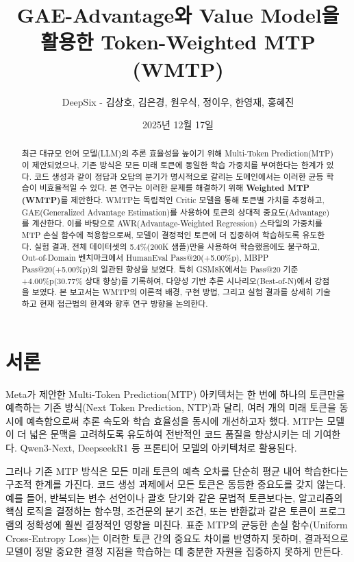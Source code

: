 \documentclass[11pt,a4paper]{article}
\title{\textbf{GAE-Advantage와 Value Model을 활용한 Token-Weighted MTP (WMTP)}}
\author{DeepSix - 김상호, 김은경, 원우식, 정이우, 한영재, 홍혜진}
\date{2025년 12월 17일}
\begin{document}
\maketitle

\begin{abstract}
최근 대규모 언어 모델(LLM)의 추론 효율성을 높이기 위해 Multi-Token Prediction(MTP)이 제안되었으나, 기존 방식은 모든 미래 토큰에 동일한 학습 가중치를 부여한다는 한계가 있다. 코드 생성과 같이 정답과 오답의 분기가 명시적으로 갈리는 도메인에서는 이러한 균등 학습이 비효율적일 수 있다. 본 연구는 이러한 문제를 해결하기 위해 \textbf{Weighted MTP (WMTP)}를 제안한다. WMTP는 독립적인 Critic 모델을 통해 토큰별 가치를 추정하고, GAE(Generalized Advantage Estimation)를 사용하여 토큰의 상대적 중요도(Advantage)를 계산한다. 이를 바탕으로 AWR(Advantage-Weighted Regression) 스타일의 가중치를 MTP 손실 함수에 적용함으로써, 모델이 결정적인 토큰에 더 집중하여 학습하도록 유도한다. 실험 결과, 전체 데이터셋의 5.4\%(200K 샘플)만을 사용하여 학습했음에도 불구하고, Out-of-Domain 벤치마크에서 HumanEval Pass@20(+5.00\%p), MBPP Pass@20(+5.00\%p)의 일관된 향상을 보였다. 특히 GSM8K에서는 Pass@20 기준 +4.00\%p(30.77\% 상대 향상)를 기록하여, 다양성 기반 추론 시나리오(Best-of-N)에서 강점을 보였다. 본 보고서는 WMTP의 이론적 배경, 구현 방법, 그리고 실험 결과를 상세히 기술하고 현재 접근법의 한계와 향후 연구 방향을 논의한다.
\end{abstract}

\section{서론}

Meta가 제안한 Multi-Token Prediction(MTP) 아키텍처는 한 번에 하나의 토큰만을 예측하는 기존 방식(Next Token Prediction, NTP)과 달리, 여러 개의 미래 토큰을 동시에 예측함으로써 추론 속도와 학습 효율성을 동시에 개선하고자 했다. MTP는 모델이 더 넓은 문맥을 고려하도록 유도하여 전반적인 코드 품질을 향상시키는 데 기여한다. Qwen3-Next, DeepseekR1 등 프론티어 모델의 아키텍처로 활용된다.

그러나 기존 MTP 방식은 모든 미래 토큰의 예측 오차를 단순히 평균 내어 학습한다는 구조적 한계를 가진다. 코드 생성 과제에서 모든 토큰은 동등한 중요도를 갖지 않는다. 예를 들어, 반복되는 변수 선언이나 괄호 닫기와 같은 문법적 토큰보다는, 알고리즘의 핵심 로직을 결정하는 함수명, 조건문의 분기 조건, 또는 반환값과 같은 토큰이 프로그램의 정확성에 훨씬 결정적인 영향을 미친다. 표준 MTP의 균등한 손실 함수(Uniform Cross-Entropy Loss)는 이러한 토큰 간의 중요도 차이를 반영하지 못하며, 결과적으로 모델이 정말 중요한 결정 지점을 학습하는 데 충분한 자원을 집중하지 못하게 만든다.
\end{document}
